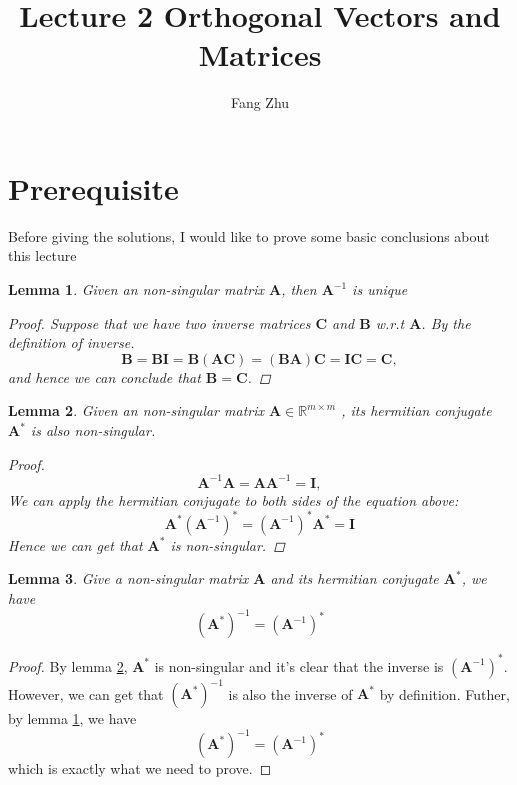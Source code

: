 \documentclass{article}
\author{Fang Zhu}
\title{Lecture 2 Orthogonal Vectors and Matrices}
\newtheorem{lemma}{Lemma}[section]
\begin{document}
\maketitle

\section{Prerequisite}
    Before giving the solutions, I would like to prove some basic conclusions about this lecture
    \begin{lemma}
        Given an non-singular matrix $\bm{A}$, then $\bm{A}^{-1}$ is unique
        \begin{proof}
        Suppose that we have two inverse matrices $\bm{C}$ and $\bm{B}$ w.r.t $\bm{A}$. By the definition of inverse. 
        \[\bm{B} =\bm{BI} = \bm{B(AC)} = \bm{(BA)C} = \bm{IC} = \bm{C},\]
        and hence we can conclude that $\bm{B} = \bm{C}$.
        \end{proof}
        \label{lem:inv-unique}
    \end{lemma} 
    
    \begin{lemma}
        Given an non-singular matrix $\bm{A} \in \mathbb{R}^{m\times m}$ , its hermitian conjugate $\bm{A}^{*}$ is also non-singular.
        \begin{proof}
            \[\bm{A}^{-1}\bm{A} = \bm{A}\bm{A}^{-1} = \bm{I},\]
        We can apply the hermitian conjugate to both sides of the equation above:
            \[ \bm{A}^{*} (\bm{A}^{-1})^{*} = (\bm{A}^{-1})^{*}\bm{A}^{*} =  \bm{I}\]
        Hence we can get that $\bm{A}^{*}$ is non-singular.
        \end{proof}
        \label{lem:22}
    \end{lemma} 
    
    \begin{lemma}
    Give a non-singular matrix $\bm{A}$ and its hermitian conjugate $\bm{A}^{*}$, we have
    \[(\bm{A}^{*})^{-1} = (\bm{A}^{-1})^{*}\]
    \end{lemma}
    \begin{proof}
    By lemma \ref{lem:22}, $\bm{A}^{*}$ is non-singular and it's clear that the inverse is $(\bm{A}^{-1})^{*}$. However, we can get that $(\bm{A}^{*})^{-1}$ is also the inverse of $\bm{A}^{*}$ by definition.
    Futher, by lemma \ref{lem:inv-unique}, we have
    $$
    (\bm{A}^{*})^{-1} = (\bm{A}^{-1})^{*}
    $$
    which is exactly what we need to prove.
    \end{proof}
    
\end{document}
